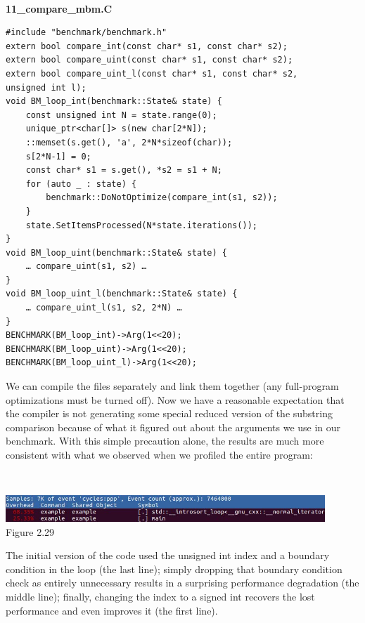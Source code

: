 \hspace*{\fill} \\ %
\noindent
\textbf{11\_compare\_mbm.C}
\begin{lstlisting}[style=styleCXX]
#include "benchmark/benchmark.h"
extern bool compare_int(const char* s1, const char* s2);
extern bool compare_uint(const char* s1, const char* s2);
extern bool compare_uint_l(const char* s1, const char* s2,
unsigned int l);
void BM_loop_int(benchmark::State& state) {
	const unsigned int N = state.range(0);
	unique_ptr<char[]> s(new char[2*N]);
	::memset(s.get(), 'a', 2*N*sizeof(char));
	s[2*N-1] = 0;
	const char* s1 = s.get(), *s2 = s1 + N;
	for (auto _ : state) {
		benchmark::DoNotOptimize(compare_int(s1, s2));
	}
	state.SetItemsProcessed(N*state.iterations());
}
void BM_loop_uint(benchmark::State& state) {
	… compare_uint(s1, s2) …
}
void BM_loop_uint_l(benchmark::State& state) {
	… compare_uint_l(s1, s2, 2*N) …
}
BENCHMARK(BM_loop_int)->Arg(1<<20);
BENCHMARK(BM_loop_uint)->Arg(1<<20);
BENCHMARK(BM_loop_uint_l)->Arg(1<<20);
\end{lstlisting}

We can compile the files separately and link them together (any full-program optimizations must be turned off). Now we have a reasonable expectation that the compiler is not generating some special reduced version of the substring comparison because of what it figured out about the arguments we use in our benchmark. With this simple precaution alone, the results are much more consistent with what we observed when we profiled the entire program:

\hspace*{\fill} \\ %
\begin{center}
\includegraphics[width=0.9\textwidth]{content/1/chapter2/images/29.jpg}\\
Figure 2.29
\end{center}

The initial version of the code used the unsigned int index and a boundary condition in the loop (the last line); simply dropping that boundary condition check as entirely unnecessary results in a surprising performance degradation (the middle line); finally, changing the index to a signed int recovers the lost performance and even improves it (the first line).

